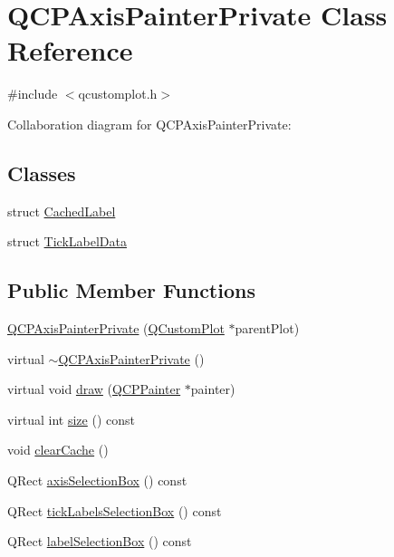 \hypertarget{class_q_c_p_axis_painter_private}{}\section{Q\+C\+P\+Axis\+Painter\+Private Class Reference}
\label{class_q_c_p_axis_painter_private}


{\ttfamily \#include $<$qcustomplot.\+h$>$}



Collaboration diagram for Q\+C\+P\+Axis\+Painter\+Private\+:
\subsection*{Classes}
\begin{DoxyCompactItemize}
\item 
struct \hyperlink{struct_q_c_p_axis_painter_private_1_1_cached_label}{Cached\+Label}
\item 
struct \hyperlink{struct_q_c_p_axis_painter_private_1_1_tick_label_data}{Tick\+Label\+Data}
\end{DoxyCompactItemize}
\subsection*{Public Member Functions}
\begin{DoxyCompactItemize}
\item 
\hyperlink{class_q_c_p_axis_painter_private_a0f14aa5c4aa83dbcd68984a7c73bf94f}{Q\+C\+P\+Axis\+Painter\+Private} (\hyperlink{class_q_custom_plot}{Q\+Custom\+Plot} $\ast$parent\+Plot)
\item 
virtual \hyperlink{class_q_c_p_axis_painter_private_a7c7f95313f0f78c3c3975f822a5fea35}{$\sim$\+Q\+C\+P\+Axis\+Painter\+Private} ()
\item 
virtual void \hyperlink{class_q_c_p_axis_painter_private_a0207a99bdf9c4f70af20928898ddc2fc}{draw} (\hyperlink{class_q_c_p_painter}{Q\+C\+P\+Painter} $\ast$painter)
\item 
virtual int \hyperlink{class_q_c_p_axis_painter_private_a60fc2eec99ed23e9a3c98e8f7e5730b0}{size} () const
\item 
void \hyperlink{class_q_c_p_axis_painter_private_a7b6806e32c44384fd0ae4dcdaa72b1b5}{clear\+Cache} ()
\item 
Q\+Rect \hyperlink{class_q_c_p_axis_painter_private_ab29635564acb5d0012fa9e297477db05}{axis\+Selection\+Box} () const
\item 
Q\+Rect \hyperlink{class_q_c_p_axis_painter_private_acf8a4fef47cec70b596fe20941aa5b16}{tick\+Labels\+Selection\+Box} () const
\item 
Q\+Rect \hyperlink{class_q_c_p_axis_painter_private_ae7800667d15867040ada5f4bf027f070}{label\+Selection\+Box} () const
\end{DoxyCompactItemize}
